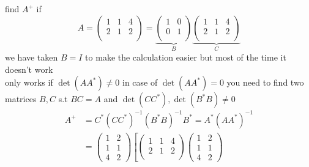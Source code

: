 \documentclass[]{article}
\begin{document}
\begin{example}
        find $A^{+}$ if 
        \[
        A = \begin{pmatrix}
                1 & 1 & 4\\
                2 & 1 & 2\\
            \end{pmatrix} 
            = 
            \underbrace{
                \begin{pmatrix}
                        1 & 0\\
                        0 & 1\\
                    \end{pmatrix}
            }_B
            \underbrace{
                \begin{pmatrix}
                        1 & 1 & 4\\
                        2 & 1 & 2\\
                    \end{pmatrix} 
            }_C
        \]
we have taken $B = I$ to make the calculation easier but most of the time it doesn't work 
\\
only works if $\det(AA^{*}) \neq 0$ in case of $\det(AA^{*}) = 0$ you need to find two matrices $B,C$ s.t
$BC = A$ and $\det(CC^{*}) , \det(B^{*}B) \neq 0$
        \begin{align*}
                A^{+} &=  C^{*}(CC^{*})^{-1} (B^{*}B)^{-1}B^{*} =  A^{*}(AA^{*})^{-1}
                \\
                &=
                \begin{pmatrix}
                        1 & 2\\
                        1 & 1\\
                        4 & 2
                    \end{pmatrix} 
                \left[
                        \begin{pmatrix}
                                1 & 1 & 4\\
                                2 & 1 & 2\\
                        \end{pmatrix} 
                        \begin{pmatrix}
                                1 & 2\\
                                1 & 1\\
                                4 & 2
                        \end{pmatrix}   

\end{align*}
\end{example}
\end{document}
